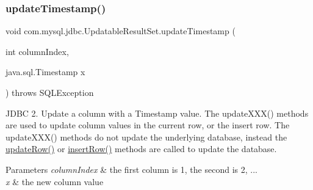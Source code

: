 \subsubsection{\texorpdfstring{update\+Timestamp()}{updateTimestamp()}\hspace{0.1cm}{\footnotesize\ttfamily [1/2]}}
{\footnotesize\ttfamily void com.\+mysql.\+jdbc.\+Updatable\+Result\+Set.\+update\+Timestamp (\begin{DoxyParamCaption}\item[{int}]{column\+Index,  }\item[{java.\+sql.\+Timestamp}]{x }\end{DoxyParamCaption}) throws S\+Q\+L\+Exception}

J\+D\+BC 2. Update a column with a Timestamp value. The update\+X\+X\+X() methods are used to update column values in the current row, or the insert row. The update\+X\+X\+X() methods do not update the underlying database, instead the \mbox{\hyperlink{classcom_1_1mysql_1_1jdbc_1_1_updatable_result_set_a919969ba4b3c7cbc7b18605e9f31a746}{update\+Row()}} or \mbox{\hyperlink{classcom_1_1mysql_1_1jdbc_1_1_updatable_result_set_aef041f8d9d0778083716fc26652648fa}{insert\+Row()}} methods are called to update the database.


\begin{DoxyParams}{Parameters}
{\em column\+Index} & the first column is 1, the second is 2, ... \\
\hline
{\em x} & the new column value\\
\hline
\end{DoxyParams}

